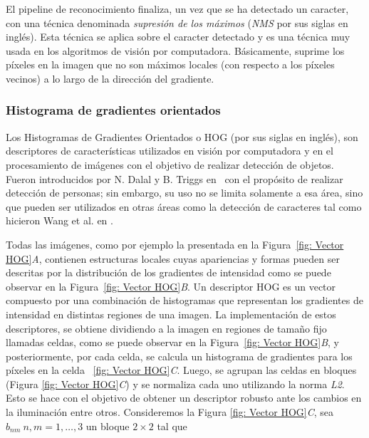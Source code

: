 	
	El pipeline de reconocimiento finaliza, un vez que se ha detectado un caracter, con una técnica denominada \textit{supresión de los máximos} (\textit{NMS} por sus siglas en inglés). Esta técnica se aplica sobre el caracter detectado y es una técnica muy usada en los algoritmos de visión por computadora. Básicamente, suprime los píxeles en la imagen que no son máximos locales (con respecto a los píxeles vecinos) a lo largo de la dirección del gradiente.

\subsubsection{Histograma de gradientes orientados}
\label{subsubsection:hog}

	Los Histogramas de Gradientes Orientados o HOG (por sus siglas en inglés), son descriptores de características utilizados en visión por computadora y en el procesamiento de imágenes con el objetivo de realizar detección de objetos. Fueron introducidos por N. Dalal y B. Triggs en~\cite{DT05} con el propósito de realizar detección de personas; sin embargo, su uso no se limita solamente a esa área, sino que pueden ser utilizados en otras áreas como la detección de caracteres tal como hicieron Wang et al. en \cite{wang}.
	
	Todas las imágenes, como por ejemplo la presentada en la Figura~\ref{fig: Vector HOG}\textit{A}, contienen estructuras locales cuyas apariencias y formas pueden ser descritas por la distribución de los gradientes de intensidad como se puede observar en la Figura~\ref{fig: Vector HOG}\textit{B}.
	Un descriptor HOG es un vector compuesto por una combinación de histogramas que representan los gradientes de intensidad en distintas regiones de una imagen. La implementación de estos descriptores, se obtiene dividiendo a la imagen en regiones de tamaño fijo llamadas celdas, como se puede observar en la Figura~\ref{fig: Vector HOG}\textit{B}, y posteriormente, por cada celda, se calcula un histograma de gradientes para los píxeles en la celda ~\ref{fig: Vector HOG}\textit{C}.
	Luego, se agrupan las celdas en bloques (Figura \ref{fig: Vector HOG}\textit{C}) y se normaliza cada uno utilizando la norma \textit{L2}. Esto se hace con el objetivo de obtener un descriptor robusto ante los cambios en la iluminación entre otros. Consideremos la Figura \ref{fig: Vector HOG}\textit{C}, sea $b_{nm}~n,m=1,\dots,3$ un bloque $2 \times 2$ tal que 
	
